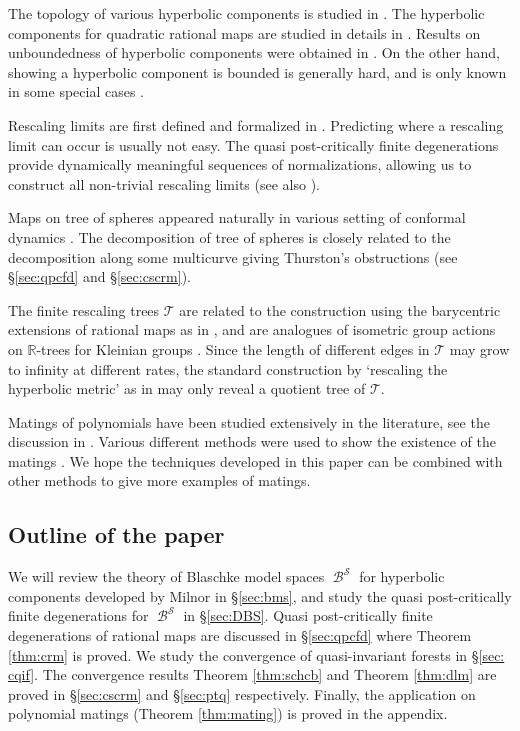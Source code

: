\documentclass[11pt, reqno]{amsart}
\numberwithin{equation}{section}
\theoremstyle{plain}
\theoremstyle{theorem}
\theoremstyle{definition}
\newcommand{\R}{\mathbb{R}}
\newcommand{\RT}{\mathscr{T}}
\DeclareMathOperator{\BP}{\mathcal{B}}
\numberwithin{figure}{section}
\begin{document}
The topology of various hyperbolic components is studied in \cite{BDK91, Milnor12, WY17}.
The hyperbolic components for quadratic rational maps are studied in details in \cite{Rees90, Rees92, Rees95}.
Results on unboundedness of hyperbolic components were obtained in \cite{Makienko00, TanLei02}. 
On the other hand, showing a hyperbolic component is bounded is generally hard, and is only known in some special cases \cite{Epstein00, NP19, NP20}.

Rescaling limits are first defined and formalized in \cite{Kiwi15}.
Predicting where a rescaling limit can occur is usually not easy.
The quasi post-critically finite degenerations provide dynamically meaningful sequences of normalizations, allowing us to construct all non-trivial rescaling limits (see also \cite{L20}).

Maps on tree of spheres appeared naturally in various setting of conformal dynamics \cite{Pilgrim03, Selinger12, Koch13, HK14, DeMF14, Arfeux17, BD20}.
The decomposition of tree of spheres is closely related to the decomposition along some multicurve giving Thurston's obstructions (see \S \ref{sec:qpcfd} and \S \ref{sec:cscrm}).

The finite rescaling trees $\RT$ are related to the construction using the barycentric extensions of rational maps as in \cite{L19p, L19b}, and are analogues of isometric group actions on $\R$-trees for Kleinian groups \cite{MorganShalen84, Bestvina88, Paulin88}.
Since the length of different edges in $\RT$ may grow to infinity at different rates, the standard construction by `rescaling the hyperbolic metric' as in \cite{L19p} may only reveal a quotient tree of $\RT$.

Matings of polynomials have been studied extensively in the literature, see the discussion in \cite{BEKMPRL12, PM12}.
Various different methods were used to show the existence of the matings \cite{TanLei92, Milnor93, PT98, Shishikura00, YZ00, HT04, BD18, DPWY20}. 
We hope the techniques developed in this paper can be combined with other methods to give more examples of matings.



\subsection*{Outline of the paper}
We will review the theory of Blaschke model spaces $\BP^\mathcal{S}$ for hyperbolic components developed by Milnor in \S \ref{sec:bms}, and study the quasi post-critically finite degenerations for $\BP^\mathcal{S}$ in \S \ref{sec:DBS}.
Quasi post-critically finite degenerations of rational maps are discussed in \S \ref{sec:qpcfd} where Theorem \ref{thm:crm} is proved.
We study the convergence of quasi-invariant forests in \S \ref{sec: cqif}.
The convergence results Theorem \ref{thm:schcb} and Theorem \ref{thm:dlm} are proved in \S \ref {sec:cscrm} and \S \ref{sec:ptq} respectively.
Finally, the application on polynomial matings (Theorem \ref{thm:mating}) is proved in the appendix.
\end{document}
